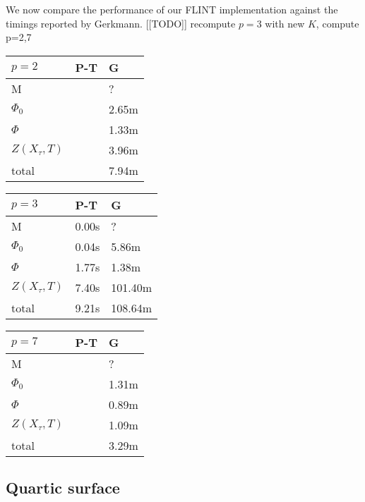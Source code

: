 \documentclass[a4paper,11pt]{article}
\numberwithin{equation}{section}
\theoremstyle{definition}
\begin{document}
We now compare the performance of our FLINT implementation against the 
timings reported by Gerkmann. [[TODO]] recompute $p=3$ with new $K$, 
compute p=2,7 \\ 

\begin{tabular}{l|l|l}
$p=2$            & \mbox{P-T} & \mbox{G}           \\
\hline                 
M                &              & ?                \\
\hline                 
$\Phi_0$         &              & 2.65m            \\
\hline                 
$\Phi$           &              & 1.33m            \\
\hline
$Z(X_{\tau},T)$  &              & 3.96m            \\
\hline
total            &              & 7.94m            \\
\end{tabular}
\quad
\begin{tabular}{l|l|l}
$p=3$            & \mbox{P-T} & \mbox{G} \\
\hline                 
M                & 0.00s        & ?               \\
\hline                 
$\Phi_0$         & 0.04s        & 5.86m           \\
\hline                 
$\Phi$           & 1.77s        & 1.38m           \\
\hline
$Z(X_{\tau},T)$  & 7.40s        & 101.40m         \\
\hline
total            & 9.21s        & 108.64m         \\
\end{tabular}
\quad
\begin{tabular}{l|l|l}
$p=7$            & \mbox{P-T} & \mbox{G}          \\
\hline                 
M                &              & ?               \\
\hline                 
$\Phi_0$         &              & 1.31m           \\
\hline                 
$\Phi$           &              & 0.89m           \\
\hline
$Z(X_{\tau},T)$  &              & 1.09m           \\
\hline
total            &              & 3.29m           \\
\end{tabular}

\subsection{Quartic surface}
\end{document}
